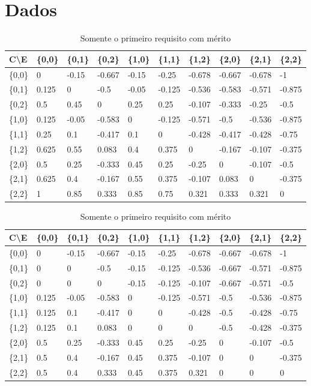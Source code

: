 \documentclass[preprint,12pt]{elsarticle}
\begin{document}
\section{Dados}
\begin{table}[h]
\caption{Todos os requisitos com mérito}
\label{table:merit-1-all}
\centering
\begin{tabular}{@{}llllllllll@{}}
\toprule
C\textbackslash E & \{0,0\} & \{0,1\} & \{0,2\} & \{1,0\} & \{1,1\} & \{1,2\} & \{2,0\} & \{2,1\} & \{2,2\} \\ \midrule
\{0,0\} & 0 & -0.15 & -0.667 & -0.15 & -0.25 & -0.678 & -0.667 & -0.678 & -1 \\
\{0,1\} & 0.125 & 0 & -0.5 & -0.05 & -0.125 & -0.536 & -0.583 & -0.571 & -0.875 \\
\{0,2\} & 0.5 & 0.45 & 0 & 0.25 & 0.25 & -0.107 & -0.333 & -0.25 & -0.5 \\
\{1,0\} & 0.125 & -0.05 & -0.583 & 0 & -0.125 & -0.571 & -0.5 & -0.536 & -0.875 \\
\{1,1\} & 0.25 & 0.1 & -0.417 & 0.1 & 0 & -0.428 & -0.417 & -0.428 & -0.75 \\
\{1,2\} & 0.625 & 0.55 & 0.083 & 0.4 & 0.375 & 0 & -0.167 & -0.107 & -0.375 \\
\{2,0\} & 0.5 & 0.25 & -0.333 & 0.45 & 0.25 & -0.25 & 0 & -0.107 & -0.5 \\
\{2,1\} & 0.625 & 0.4 & -0.167 & 0.55 & 0.375 & -0.107 & 0.083 & 0 & -0.375 \\
\{2,2\} & 1 & 0.85 & 0.333 & 0.85 & 0.75 & 0.321 & 0.333 & 0.321 & 0 \\
\bottomrule
\end{tabular}

\caption{ Somente o primeiro requisito com mérito}
\label{table:merit-0-and-1}
\begin{tabular}{@{}llllllllll@{}}
\toprule
C\textbackslash E & \{0,0\} & \{0,1\} & \{0,2\} & \{1,0\} & \{1,1\} & \{1,2\} & \{2,0\} & \{2,1\} & \{2,2\} \\ \midrule
\{0,0\} & 0 & -0.15 & -0.667 & -0.15 & -0.25 & -0.678 & -0.667 & -0.678 & -1 \\
\{0,1\} & 0 & 0 & -0.5 & -0.15 & -0.125 & -0.536 & -0.667 & -0.571 & -0.875 \\
\{0,2\} & 0 & 0 & 0 & -0.15 & -0.125 & -0.107 & -0.667 & -0.571 & -0.5 \\
\{1,0\} & 0.125 & -0.05 & -0.583 & 0 & -0.125 & -0.571 & -0.5 & -0.536 & -0.875 \\
\{1,1\} & 0.125 & 0.1 & -0.417 & 0 & 0 & -0.428 & -0.5 & -0.428 & -0.75 \\
\{1,2\} & 0.125 & 0.1 & 0.083 & 0 & 0 & 0 & -0.5 & -0.428 & -0.375 \\
\{2,0\} & 0.5 & 0.25 & -0.333 & 0.45 & 0.25 & -0.25 & 0 & -0.107 & -0.5 \\
\{2,1\} & 0.5 & 0.4 & -0.167 & 0.45 & 0.375 & -0.107 & 0 & 0 & -0.375 \\
\{2,2\} & 0.5 & 0.4 & 0.333 & 0.45 & 0.375 & 0.321 & 0 & 0 & 0 \\ \bottomrule
\end{tabular}


\end{table}
\end{document}

